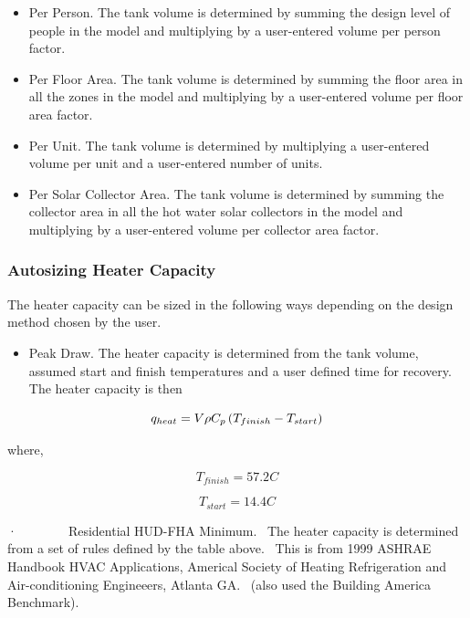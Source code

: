 \begin{itemize}
  \item Per Person. The tank volume is determined by summing the design level of people in the model and multiplying by a user-entered volume per person factor.

  \item Per Floor Area. The tank volume is determined by summing the floor area in all the zones in the model and multiplying by a user-entered volume per floor area factor.

  \item Per Unit. The tank volume is determined by multiplying a user-entered volume per unit and a user-entered number of units.

  \item Per Solar Collector Area. The tank volume is determined by summing the collector area in all the hot water solar collectors in the model and multiplying by a user-entered volume per collector area factor.
\end{itemize}

\subsubsection{Autosizing Heater Capacity}\label{autosizing-heater-capacity}

The heater capacity can be sized in the following ways depending on the design method chosen by the user.

\begin{itemize}
  \item Peak Draw. The heater capacity is determined from the tank volume, assumed start and finish temperatures and a user defined time for recovery.~ The heater capacity is then
\end{itemize}

\begin{equation}
  q_{heat} = V\rho C_p \PB{T_{finish} - T_{start}}
\end{equation}

where,

\begin{equation}
{T_{finish}} = 57.2C
\end{equation}

\begin{equation}
{T_{start}} = 14.4C
\end{equation}

·~~~~~~~~Residential HUD-FHA Minimum.~ The heater capacity is determined from a set of rules defined by the table above.~ This is from 1999 ASHRAE Handbook HVAC Applications, Americal Society of Heating Refrigeration and Air-conditioning Engineeers, Atlanta GA.~ (also used the Building America Benchmark).


